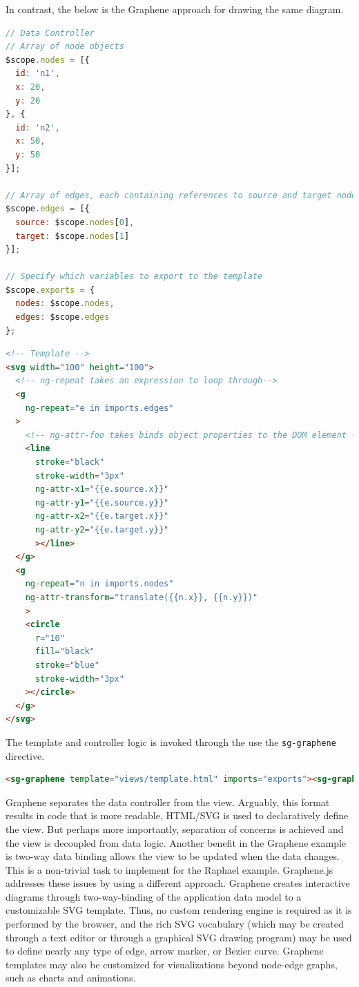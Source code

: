 In contrast, the below is the Graphene approach for drawing the same diagram. \autocite{gu2014grapheneSimple}

\begin{lstlisting}[language=JavaScript]
// Data Controller
// Array of node objects
$scope.nodes = [{
  id: 'n1',
  x: 20,
  y: 20
}, {
  id: 'n2',
  x: 50,
  y: 50
}];

// Array of edges, each containing references to source and target nodes
$scope.edges = [{
  source: $scope.nodes[0],
  target: $scope.nodes[1]
}];

// Specify which variables to export to the template
$scope.exports = {
  nodes: $scope.nodes,
  edges: $scope.edges
};
\end{lstlisting}

\begin{lstlisting}[language=html]
<!-- Template -->
<svg width="100" height="100">
  <!-- ng-repeat takes an expression to loop through-->
  <g
    ng-repeat="e in imports.edges"
  >
    <!-- ng-attr-foo takes binds object properties to the DOM element -->
    <line 
      stroke="black"
      stroke-width="3px"
      ng-attr-x1="{{e.source.x}}"
      ng-attr-y1="{{e.source.y}}"
      ng-attr-x2="{{e.target.x}}"
      ng-attr-y2="{{e.target.y}}"
      ></line>
  </g>
  <g 
    ng-repeat="n in imports.nodes"
    ng-attr-transform="translate({{n.x}}, {{n.y}})"
    >
    <circle
      r="10"
      fill="black"
      stroke="blue"
      stroke-width="3px"
    ></circle>
  </g>
</svg>
\end{lstlisting}

The template and controller logic is invoked through the use the \texttt{sg-graphene} directive.

\begin{lstlisting}[language=html]
<sg-graphene template="views/template.html" imports="exports"><sg-graphene>
\end{lstlisting}

Graphene separates the data controller from the view.
Arguably, this format results in code that is more readable, HTML/SVG is used to declaratively define the view.
But perhaps more importantly, separation of concerns is achieved and the view is decoupled from data logic.
Another benefit in the Graphene example is two-way data binding allows the view to be updated when the data changes.
This is a non-trivial task to implement for the Raphael example.
Graphene.js addresses these issues by using a different approach.
Graphene creates interactive diagrams through two-way-binding of the application data model to a customizable SVG template.
Thus, no custom rendering engine is required as it is performed by the browser, and the rich SVG vocabulary (which may be created through a text editor or through a graphical SVG drawing program) may be used to define nearly any type of edge, arrow marker, or Bezier curve.
Graphene templates may also be customized for visualizations beyond node-edge graphs, such as charts and animations.


